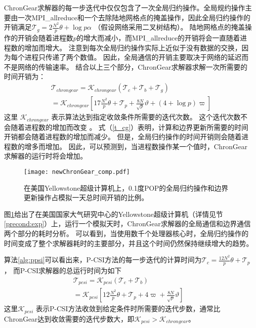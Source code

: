  
ChronGear求解器的每一步迭代中仅仅包含了一次全局归约操作。全局规约操作主要由一次MPI\_allreduce和一个去除陆地网格点的掩盖操作，因此全局归约操作的开销满足$\mathcal{T}_g= 2\frac{N^2}{p}\theta + \log p \alpha$ （假设网络采用二叉树结构）。 
陆地网格点的掩盖操作的开销会随着进程数$p$的增大而减小，而MPI\_allreduce的开销将会一直随着进程数的增加而增大。 
注意到每次全局归约操作实际上近似于没有数据的交换，因为每个进程只传递了两个数值。
因此，全局通信的开销主要取决于网络的延迟而不是网络的传输速率。
结合以上三个部分，ChronGear求解器求解一次所需要的时间开销为：
\begin{eqnarray}
\label{t_cg}
&\mathcal{T}_{chrongear}=\mathcal{K}_{chrongear} (\mathcal{T}_c + \mathcal{T}_b+\mathcal{T}_g )\nonumber \\
&=\mathcal{K}_{chrongear} [17 \frac{N^2}{p}\theta + \mathcal{T}_{p} +\frac{8N}{\sqrt{p}}\vartheta +(4+\log p)\varpi]
\end{eqnarray}
这里 $\mathcal{K}_{chrongear}$ 表示算法达到指定收敛条件所需要的迭代次数。
这个迭代次数不会随着进程数的增加而改变 \cite{hu2013scalable}。 
式（\ref{t_cg}）表明，计算和边界更新所需要的时间开销都会随着进程数的增加而减少。 
但是，全局归约操作的时间开销则会随着进程数的增多而增加。 
因此，可以预测到，当进程数操作某一个值时，ChronGear求解器的运行时将会增加。 

\begin{figure}[!t]
\begin{center}
	\texttt{[image: newChronGear\_comp.pdf]}
\caption[] {在美国Yellowstone超级计算机上，0.1度POP的全局归约操作和边界更新操作占模拟一天总时间开销的比例。}
\label{fig:ChronGearCOMP}
\end{center}
\end{figure}
 
图\ref{fig:ChronGearCOMP}给出了在美国国家大气研究中心的Yellowstone超级计算机（详情见节\ref{precond:exp}）上，运行一个模拟天时，ChronGear求解器的全局通信和边界通信两个部分的耗时分析。 
可以看到，当使用数千个处理器核心时，全局归约操作的时间变成了整个求解器耗时的主要部分，并且这个时间仍然保持继续增大的趋势。



算法\ref{alg:ppsi}可以看出来，P-CSI方法的每一步迭代的计算时间为$\mathcal{T}_c =\frac{12N^2}{p}\theta+\mathcal{T}_p$， 
而P-CSI求解器的总运行时间为如下
\begin{eqnarray}
\label{t_psi}
\mathcal{T}_{pcsi} = \mathcal{K}_{pcsi}(\mathcal{T}_c + \mathcal{T}_b ) \nonumber \\
= \mathcal{K}_{pcsi}[12\frac{N^2}{p}\theta+ \mathcal{T}_p +4\varpi + \frac{8N}{ \sqrt{p}}\vartheta]
\end{eqnarray}
这里$\mathcal{K}_{pcsi}$ 表示P-CSI方法收敛到给定条件时所需要的迭代步数，通常比ChronGear达到收敛需要的迭代步数大，即$\mathcal{K}_{pcsi}>\mathcal{K}_{chrongear}$。 




